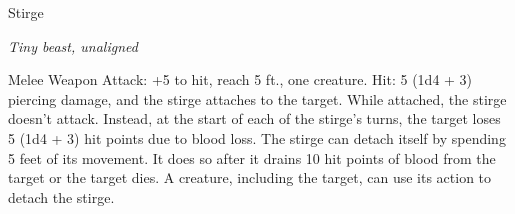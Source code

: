 \begin{monsterbox}{Stirge}
\begin{hangingpar}
\textit{Tiny beast, unaligned}
\end{hangingpar}
\dndline%
\basics[%
armorclass = 14,
hitpoints = 1d4,
speed = {10 ft., fly 40 ft.}
]
\dndline%
\stats[%
STR = \stat{4},
DEX = \stat{16},
CON = \stat{11},
INT = \stat{2},
WIS = \stat{8},
CHA = \stat{6}
]
\dndline%
\details[%
skills={},
damageimmunities={},
savingthrows={},
conditionimmunities={},
damageresistances={},
damagevulnerabilities={},
senses={darkvision 60 ft., passive Perception 9},
challenge=1/8
]
\dndline%
\begin{monsteraction}
Melee Weapon Attack: +5 to hit, reach 5 ft., one creature. Hit: 5 (1d4 + 3) piercing damage, and the stirge attaches to the target. While attached, the stirge doesn't attack. Instead, at the start of each of the stirge's turns, the target loses 5 (1d4 + 3) hit points due to blood loss.
The stirge can detach itself by spending 5 feet of its movement. It does so after it drains 10 hit points of blood from the target or the target dies. A creature, including the target, can use its action to detach the stirge.
\end{monsteraction}
\end{monsterbox}